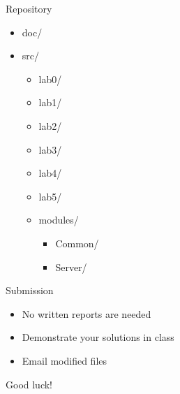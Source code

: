 \documentclass[compress,xcolor=table]{beamer}
\begin{document}
\begin{frame}{Repository}
  \centering
  \begin{itemize}
    \item doc/
    \item src/
      \begin{itemize}
        \item lab0/
        \item lab1/
        \item lab2/
        \item lab3/
        \item lab4/
        \item lab5/
        \item modules/
          \begin{itemize}
            \item Common/
            \item Server/
          \end{itemize}
      \end{itemize}
  \end{itemize}
\end{frame}

\begin{frame}{Submission}
  \centering
  \begin{itemize}
    \item No written reports are needed
    \item Demonstrate your solutions in class
    \item Email modified files
  \end{itemize}
\end{frame}

\begin{frame}
  \vspace{3em}
  \begin{center}
    {\huge Good luck!}
  \end{center}
\end{frame}
\end{document}
